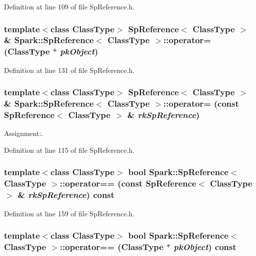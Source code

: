 Definition at line 109 of file Sp\-Reference.h.
\subsubsection{\setlength{\rightskip}{0pt plus 5cm}template$<$class Class\-Type$>$ {\bf Sp\-Reference}$<$ Class\-Type $>$ \& {\bf Spark::Sp\-Reference}$<$ Class\-Type $>$::operator= (Class\-Type $\ast$ {\em pk\-Object})}\label{classSpark_1_1SpReference_a7}


Definition at line 131 of file Sp\-Reference.h.
\subsubsection{\setlength{\rightskip}{0pt plus 5cm}template$<$class Class\-Type$>$ {\bf Sp\-Reference}$<$ Class\-Type $>$ \& {\bf Spark::Sp\-Reference}$<$ Class\-Type $>$::operator= (const {\bf Sp\-Reference}$<$ Class\-Type $>$ \& {\em rk\-Sp\-Reference})}\label{classSpark_1_1SpReference_a6}


Assignment:. 

Definition at line 115 of file Sp\-Reference.h.
\subsubsection{\setlength{\rightskip}{0pt plus 5cm}template$<$class Class\-Type$>$ bool {\bf Spark::Sp\-Reference}$<$ Class\-Type $>$::operator== (const {\bf Sp\-Reference}$<$ Class\-Type $>$ \& {\em rk\-Sp\-Reference}) const}\label{classSpark_1_1SpReference_a10}


Definition at line 159 of file Sp\-Reference.h.
\subsubsection{\setlength{\rightskip}{0pt plus 5cm}template$<$class Class\-Type$>$ bool {\bf Spark::Sp\-Reference}$<$ Class\-Type $>$::operator== (Class\-Type $\ast$ {\em pk\-Object}) const}\label{classSpark_1_1SpReference_a8}


